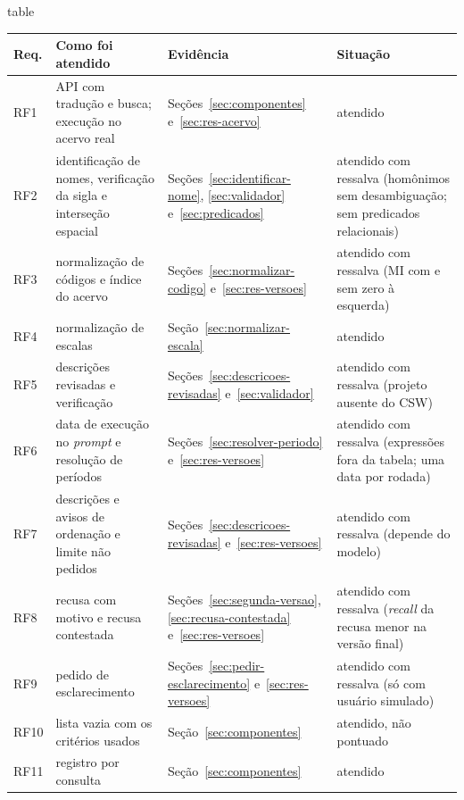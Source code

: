 \begin{fixo}{table}
\centering
\caption{Atendimento dos requisitos}
\label{tab:atendimento}
\footnotesize
\begin{tabular}{|>{\raggedright\arraybackslash}p{1.1cm}|>{\raggedright\arraybackslash}p{5.9cm}|>{\raggedright\arraybackslash}p{3.4cm}|>{\raggedright\arraybackslash}p{3.8cm}|}
\hline
\textbf{Req.} & \textbf{Como foi atendido} & \textbf{Evidência} & \textbf{Situação} \\ \hline
RF1 & API com tradução e busca; execução no acervo real & Seções~\ref{sec:componentes} e~\ref{sec:res-acervo} & atendido \\ \hline
RF2 & identificação de nomes, verificação da sigla e interseção espacial & Seções~\ref{sec:identificar-nome}, \ref{sec:validador} e~\ref{sec:predicados} & atendido com ressalva (homônimos sem desambiguação; sem predicados relacionais) \\ \hline
RF3 & normalização de códigos e índice do acervo & Seções~\ref{sec:normalizar-codigo} e~\ref{sec:res-versoes} & atendido com ressalva (MI com e sem zero à esquerda) \\ \hline
RF4 & normalização de escalas & Seção~\ref{sec:normalizar-escala} & atendido \\ \hline
RF5 & descrições revisadas e verificação & Seções~\ref{sec:descricoes-revisadas} e~\ref{sec:validador} & atendido com ressalva (projeto ausente do CSW) \\ \hline
RF6 & data de execução no \textit{prompt} e resolução de períodos & Seções~\ref{sec:resolver-periodo} e~\ref{sec:res-versoes} & atendido com ressalva (expressões fora da tabela; uma data por rodada) \\ \hline
RF7 & descrições e avisos de ordenação e limite não pedidos & Seções~\ref{sec:descricoes-revisadas} e~\ref{sec:res-versoes} & atendido com ressalva (depende do modelo) \\ \hline
RF8 & recusa com motivo e recusa contestada & Seções~\ref{sec:segunda-versao}, \ref{sec:recusa-contestada} e~\ref{sec:res-versoes} & atendido com ressalva (\textit{recall} da recusa menor na versão final) \\ \hline
RF9 & pedido de esclarecimento & Seções~\ref{sec:pedir-esclarecimento} e~\ref{sec:res-versoes} & atendido com ressalva (só com usuário simulado) \\ \hline
RF10 & lista vazia com os critérios usados & Seção~\ref{sec:componentes} & atendido, não pontuado \\ \hline
RF11 & registro por consulta & Seção~\ref{sec:componentes} & atendido \\ \hline

\end{tabular}
\end{fixo}
